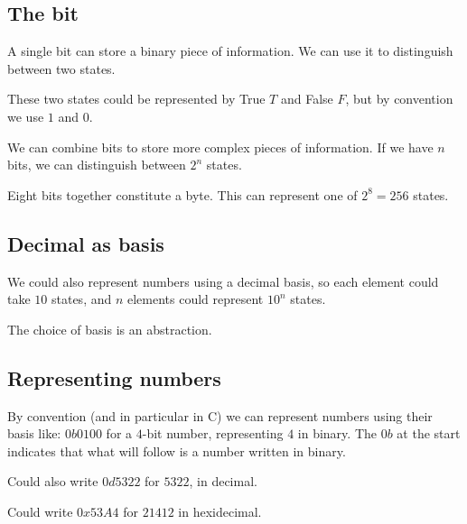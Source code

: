 
\subsection{The bit}

A single bit can store a binary piece of information. We can use it to distinguish between two states.

These two states could be represented by True \(T\) and False \(F\), but by convention we use \(1\) and \(0\).

We can combine bits to store more complex pieces of information. If we have \(n\) bits, we can distinguish between \(2^n\) states.

Eight bits together constitute a byte. This can represent one of \(2^8=256\) states.

\subsection{Decimal as basis}

We could also represent numbers using a decimal basis, so each element could take \(10\) states, and \(n\) elements could represent \(10^n\) states.

The choice of basis is an abstraction.

\subsection{Representing numbers}

By convention (and in particular in C) we can represent numbers using their basis like: \(0b0100\) for a \(4\)-bit number, representing \(4\) in binary. The \(0b\) at the start indicates that what will follow is a number written in binary.

Could also write \(0d5322\) for \(5322\), in decimal.

Could write \(0x53A4\) for \(21412\) in hexidecimal.
